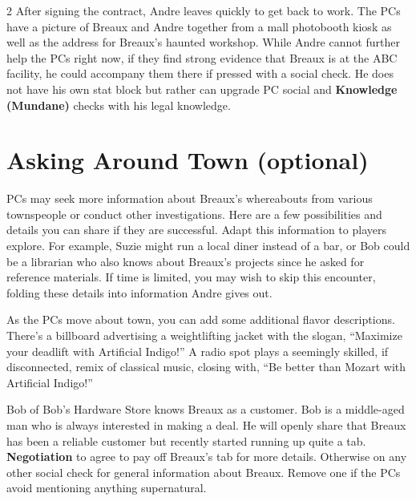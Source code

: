 \documentclass{book}
\newcommand{\df}{\DifficultyDie }
\newcommand{\stb}{\SetbackDie }
\newcommand{\ch}{\ChallengeDie }
\newcommand{\ai}{{\color{cyan}Artificial Indigo}\xspace}
\begin{document}
\begin{multicols*}{2}
After signing the contract, Andre leaves quickly to get back to work.  The PCs have a picture of Breaux and Andre together from a mall photobooth kiosk as well as the address for Breaux's haunted workshop.  While Andre cannot further help the PCs right now, if they find strong evidence that Breaux is at the ABC facility, he could accompany them there if pressed with a social check.  He does not have his own stat block but rather can upgrade PC social and \textbf{Knowledge (Mundane)} checks with his legal knowledge.

\section{Asking Around Town (optional)}

PCs may seek more information about Breaux's whereabouts from various townspeople or conduct other investigations.  Here are a few possibilities and details you can share if they are successful.  Adapt this information to players explore.  For example, Suzie might run a local diner instead of a bar, or Bob could be a librarian who also knows about Breaux's projects since he asked for reference materials.  If time is limited, you may wish to skip this encounter, folding these details into information Andre gives out.

As the PCs move about town, you can add some additional flavor descriptions.  There's a billboard advertising a weightlifting jacket with the slogan, ``Maximize your deadlift with \ai!''  A radio spot plays a seemingly skilled, if disconnected, remix of classical music, closing with, ``Be better than Mozart with \ai!''

Bob of Bob's Hardware Store knows Breaux as a customer.  Bob is a middle-aged man who is always interested in making a deal.  He will openly share that Breaux has been a reliable customer but recently started running up quite a tab.  \ch\df\stb \textbf{Negotiation} to agree to pay off Breaux's tab for more details.  Otherwise \df\df\stb\stb on any other social check for general information about Breaux.  Remove one \stb if the PCs avoid mentioning anything supernatural.


\end{multicols*}
\end{document}
